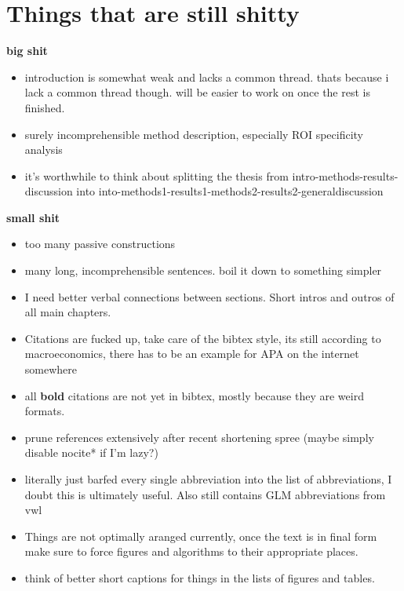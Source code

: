 \documentclass[a4paper, 12pt]{scrreprt}
\begin{document}
\chapter{Things that are still shitty}
\textbf{big shit}
\begin{itemize}
	\item introduction is somewhat weak and lacks a common thread. thats because i lack a common thread though. will be easier to work on once the rest is finished.
	\item surely incomprehensible method description, especially ROI specificity analysis
	\item it's worthwhile to think about splitting the thesis from intro-methods-results-discussion into into-methods1-results1-methods2-results2-generaldiscussion
\end{itemize}
\textbf{small shit}
\begin{itemize}
	\item too many passive constructions
	\item many long, incomprehensible sentences. boil it down to something simpler
	\item I need better verbal connections between sections. Short intros and outros of all main chapters.
	\item Citations are fucked up, take care of the bibtex style, its still according to macroeconomics, there has to be an example for APA on the internet somewhere
	\item all \textbf{bold} citations are not yet in bibtex, mostly because they are weird formats.
	\item prune references extensively after recent shortening spree (maybe simply disable nocite{*} if I'm lazy?)
	\item literally just barfed every single abbreviation into the list of abbreviations, I doubt this is ultimately useful. Also still contains GLM abbreviations from vwl
	\item Things are not optimally aranged currently, once the text is in final form make sure to force figures and algorithms to their appropriate places.
	\item think of better short captions for things in the lists of figures and tables.
\end{itemize}




\pagebreak

\bigskip\bigskip

\clearpage
\end{document}
